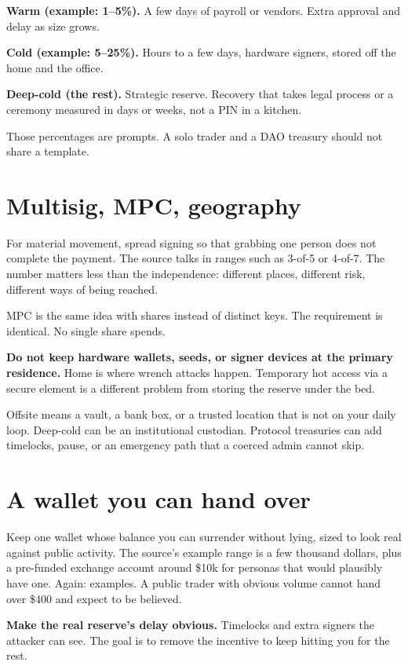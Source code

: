 \textbf{Warm (example: 1--5\%).} A few days of payroll or
vendors. Extra approval and delay as size grows.

\textbf{Cold (example: 5--25\%).} Hours to a few days,
hardware signers, stored off the home and the office.

\textbf{Deep-cold (the rest).} Strategic reserve.
Recovery that takes legal process or a ceremony measured
in days or weeks, not a PIN in a kitchen.

Those percentages are prompts. A solo trader and a DAO
treasury should not share a template.

\section{Multisig, MPC, geography}

For material movement, spread signing so that grabbing
one person does not complete the payment. The source
talks in ranges such as 3-of-5 or 4-of-7. The number
matters less than the independence: different places,
different risk, different ways of being reached.

MPC is the same idea with shares instead of distinct
keys. The requirement is identical. No single share
spends.

\textbf{Do not keep hardware wallets, seeds, or signer
devices at the primary residence.} Home is where wrench
attacks happen. Temporary hot access via a secure
element is a different problem from storing the reserve
under the bed.

Offsite means a vault, a bank box, or a trusted location
that is not on your daily loop. Deep-cold can be an
institutional custodian. Protocol treasuries can add
timelocks, pause, or an emergency path that a coerced
admin cannot skip.

\section{A wallet you can hand over}

Keep one wallet whose balance you can surrender without
lying, sized to look real against public activity. The
source's example range is a few thousand dollars, plus
a pre-funded exchange account around \$10k for personas
that would plausibly have one. Again: examples. A public
trader with obvious volume cannot hand over \$400 and
expect to be believed.

\textbf{Make the real reserve's delay obvious.}
Timelocks and extra signers the attacker can see. The
goal is to remove the incentive to keep hitting you for
the rest.

